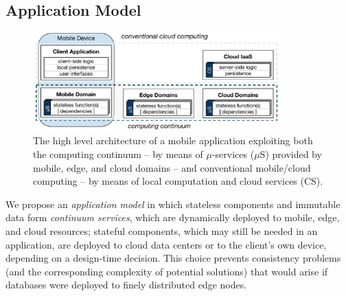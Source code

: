 




\subsection{Application Model}\label{sec:application_model}

\begin{figure}[tbp]
	\includegraphics[width=0.85\textwidth]{figs/Continuum-arch}
	\setlength{\belowcaptionskip}{-10pt}
	\caption{The high level architecture of a mobile application exploiting both the computing continuum -- by means of $\mu$-services ($\mu$S) provided by mobile, edge, and cloud domains -- and conventional mobile/cloud computing -- by means of local computation and cloud services (CS).}
	\label{fig:Continuum-arch}
\end{figure}

We propose an \textit{application model} in which stateless components and immutable data form \textit{continuum services}, which are dynamically deployed to mobile, edge, and cloud resources; stateful components, which may still be needed in an application, are deployed to cloud data centers or to the client's own device, depending on a design-time decision. This choice prevents consistency problems (and the corresponding complexity of potential solutions) that would arise if databases were deployed to finely distributed edge nodes.

